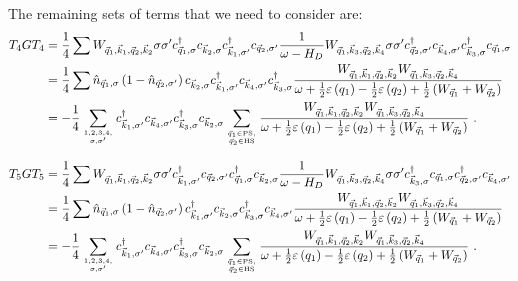 \documentclass{revtex4-2}
\begin{document}
The remaining sets of terms that we need to consider are:
\begin{equation}\begin{aligned}
	T_4 G T_4 &= \frac{1}{4}\sum  W_{\vec q_1,\vec k_1, \vec q_2, \vec k_2} \sigma\sigma^\prime c^\dagger_{\vec q_1,\sigma}c_{\vec k_2,\sigma}c^\dagger_{\vec k_1,\sigma^\prime}c_{\vec q_2,\sigma^\prime} \frac{1}{\omega - H_D}W_{\vec q_1, \vec k_3, \vec q_2, \vec k_4} \sigma\sigma^\prime c^\dagger_{\vec q_2,\sigma^\prime}c_{\vec k_4,\sigma^\prime}c^\dagger_{\vec k_3,\sigma}c_{\vec q_1,\sigma}\\
		  &= \frac{1}{4}\sum \hat n_{\vec q_1,\sigma} \left(1 - \hat n_{\vec q_2,\sigma^\prime}\right) c_{\vec k_2,\sigma}c^\dagger_{\vec k_1,\sigma^\prime}c_{\vec k_4,\sigma^\prime}c^\dagger_{\vec k_3,\sigma} \frac{W_{\vec q_1,\vec k_1, \vec q_2, \vec k_2} W_{\vec q_1, \vec k_3, \vec q_2, \vec k_4}}{\omega + \frac{1}{2}\varepsilon\left(q_1\right) - \frac{1}{2}\varepsilon\left(q_2\right) + \frac{1}{2}\left(W_{\vec q_1} + W_{\vec q_2}\right)}  \\
		  &= -\frac{1}{4}\sum_{1,2,3,4,\atop{\sigma,\sigma^\prime}} c^\dagger_{\vec k_1,\sigma^\prime}c_{\vec k_4,\sigma^\prime}c^\dagger_{\vec k_3,\sigma}c_{\vec k_2,\sigma} \sum_{\vec q_1 \in \text{PS}, \atop{\vec q_2 \in \text{HS}}}\frac{W_{\vec q_1,\vec k_1, \vec q_2, \vec k_2} W_{\vec q_1, \vec k_3, \vec q_2, \vec k_4}}{\omega + \frac{1}{2}\varepsilon\left(q_1\right) - \frac{1}{2}\varepsilon\left(q_2\right) + \frac{1}{2}\left(W_{\vec q_1} + W_{\vec q_2}\right)}~.
\end{aligned}\end{equation}

\begin{equation}\begin{aligned}
	T_5 G T_5 &= \frac{1}{4}\sum  W_{\vec q_1,\vec k_1, \vec q_2, \vec k_2} \sigma\sigma^\prime c^\dagger_{\vec k_1,\sigma^\prime}c_{\vec q_2,\sigma^\prime}c^\dagger_{\vec q_1,\sigma}c_{\vec k_2,\sigma} \frac{1}{\omega - H_D}W_{\vec q_1, \vec k_3, \vec q_2, \vec k_4} \sigma\sigma^\prime c^\dagger_{\vec k_3,\sigma}c_{\vec q_1,\sigma}c^\dagger_{\vec q_2,\sigma^\prime}c_{\vec k_4,\sigma^\prime}\\
		  &= \frac{1}{4}\sum \hat n_{\vec q_1,\sigma} \left(1 - \hat n_{\vec q_2,\sigma^\prime}\right) c^\dagger_{\vec k_1,\sigma^\prime}c_{\vec k_2,\sigma}c^\dagger_{\vec k_3,\sigma}c_{\vec k_4,\sigma^\prime} \frac{W_{\vec q_1,\vec k_1, \vec q_2, \vec k_2} W_{\vec q_1, \vec k_3, \vec q_2, \vec k_4}}{\omega + \frac{1}{2}\varepsilon\left(q_1\right) - \frac{1}{2}\varepsilon\left(q_2\right) + \frac{1}{2}\left(W_{\vec q_1} + W_{\vec q_2}\right)}  \\
		  &= -\frac{1}{4}\sum_{1,2,3,4,\atop{\sigma,\sigma^\prime}} c^\dagger_{\vec k_1,\sigma^\prime} c_{\vec k_4,\sigma^\prime} c^\dagger_{\vec k_3,\sigma} c_{\vec k_2,\sigma} \sum_{\vec q_1 \in \text{PS}, \atop{\vec q_2 \in \text{HS}}}\frac{W_{\vec q_1,\vec k_1, \vec q_2, \vec k_2} W_{\vec q_1, \vec k_3, \vec q_2, \vec k_4}}{\omega + \frac{1}{2}\varepsilon\left(q_1\right) - \frac{1}{2}\varepsilon\left(q_2\right) + \frac{1}{2}\left(W_{\vec q_1} + W_{\vec q_2}\right)}~.
\end{aligned}\end{equation}
\end{document}

